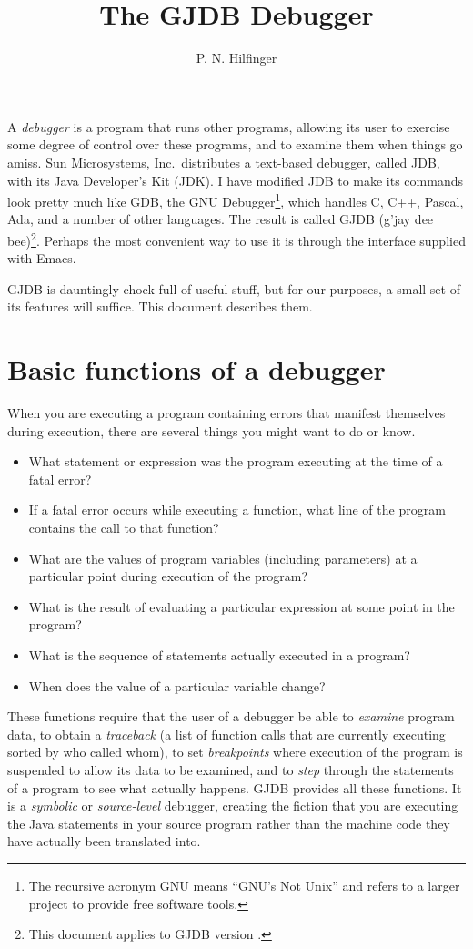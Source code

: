 \documentclass[11pt,twoside]{handout}
\author{P. N. Hilfinger}
\title{The GJDB Debugger}
\begin{document}
\makecompacttitle

A {\it debugger\/} is a program that runs other programs, allowing its
user to exercise
some degree of control over these programs, and to examine them when
things go amiss.  
Sun Microsystems, Inc.\ distributes a  text-based
debugger, called JDB, with its Java Developer's Kit
(JDK).    I have
modified JDB to make its commands look pretty much like GDB, the GNU
Debugger\footnote{The recursive acronym GNU means ``GNU's Not Unix''
and refers to a larger project to provide free software tools.},
which handles C, C++, Pascal, Ada, and a number of 
other languages.  The result is called GJDB (g'jay dee
bee)\footnote{This document applies to GJDB version .}.  Perhaps
the most convenient way to use it is through the interface supplied
with Emacs.  

GJDB is dauntingly chock-full of useful stuff, but for our purposes, a
small set of its features will suffice.  This document describes them.

\section{Basic functions of a debugger}

When you are executing a program containing errors that manifest
themselves during execution, there are several things you might want
to do or know.
\begin{itemize}
\item What statement or expression was the program executing at the
time of a fatal error? 
\item If a fatal error occurs while executing a function, what line of
the program contains the call to that function?
\item What are the values of program variables (including parameters)
at a particular point during execution of the program?
\item What is the result of evaluating a particular expression at some
point in the program?
\item What is the sequence of statements actually executed in a
program?
\item When does the value of a particular variable change?
\end{itemize}
These functions require that the user of a debugger be able to {\it examine\/}
program data, to obtain a {\it traceback\/} (a list of function calls
that are currently executing sorted by who called whom), to set  {\it
breakpoints\/} where execution of the program is suspended to allow
its data to be examined, and to {\it step\/} through the statements of
a program to see what actually happens.  GJDB provides all these
functions.  It is a {\it symbolic\/} or {\it source-level\/} debugger,
creating the fiction that you are executing the Java
statements in your source program rather than the machine code they have
actually been translated into.
\end{document}
